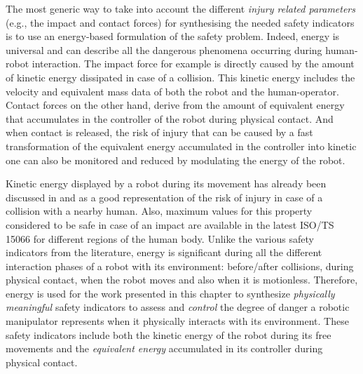 The most generic way to take into account the different \textit{injury related parameters} (e.g., the impact and contact forces) for synthesising the needed safety indicators is to use an energy-based formulation of the safety problem. Indeed, energy is universal and can describe all the dangerous phenomena occurring during human-robot interaction. The impact force for example is directly caused by the amount of kinetic energy dissipated in case of a collision. This kinetic energy includes the velocity and equivalent mass data of both the robot and the human-operator. Contact forces on the other hand, derive from the amount of equivalent energy that accumulates in the controller of the robot during physical contact. And when contact is released, the risk of injury that can be caused by a fast transformation of the equivalent energy accumulated in the controller into kinetic one can also be monitored and reduced by modulating the energy of the robot.

Kinetic energy displayed by a robot during its movement has already been discussed in \cite{haddadin2008collision} and \cite{haddadin2012truly} as a good representation of the risk of injury in case of a collision with a nearby human. Also, maximum values for this property considered to be safe in case of an impact are available in the latest ISO/TS 15066 \cite{ISO15066PDF} for different regions of the human body. Unlike the various safety indicators from the literature, energy is significant during all the different interaction phases of a robot with its environment: before/after collisions, during physical contact, when the robot moves and also when it is motionless. Therefore, energy is used for the work presented in this chapter to synthesize \textit{physically meaningful} safety indicators to assess and \textit{control} the degree of danger a robotic manipulator represents when it physically interacts with its environment. These safety indicators include both the kinetic energy of the robot during its free movements and the \textit{equivalent energy} accumulated in its controller during physical contact.

